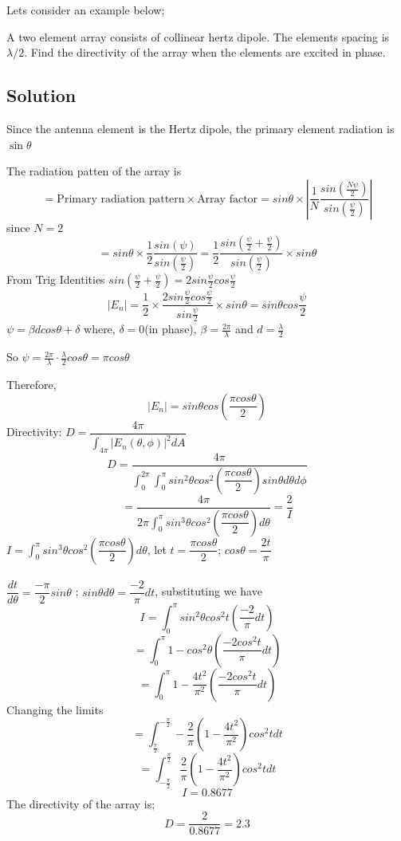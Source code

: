 Lets consider an example below;
\begin{exmp}
A two element array consists of collinear hertz dipole. The elements spacing is $\lambda/2$. Find the directivity of the array when the elements are excited in phase. 
\subsection*{\centering Solution} 
Since the antenna element is the Hertz dipole, the primary element radiation is $\sin\theta$ 

The radiation patten of the array is
\begin{dmath*}
= \text{Primary radiation pattern} \times \text{Array factor}= sin\theta \times \left|\dfrac{1}{N} \dfrac{sin(\frac{N \psi}{2})}{sin(\frac{\psi}{2})}\right|
\end{dmath*}
since $N = 2$ 
$$ = sin\theta \times \dfrac{1}{2} \dfrac{sin( \psi)}{sin(\frac{\psi}{2})} = \dfrac{1}{2} \dfrac{sin(\frac{\psi}{2}+ \frac{\psi}{2})}{sin(\frac{\psi}{2})} \times sin\theta $$ 
From Trig Identities $sin(\frac{\psi}{2}+ \frac{\psi}{2}) = 2sin\frac{\psi}{2}cos\frac{\psi}{2}$
$$ |E_{n}| = \dfrac{1}{2} \times \dfrac{2sin\frac{\psi}{2}cos\frac{\psi}{2}}{sin\frac{\psi}{2}}  \times sin\theta = sin\theta cos\frac{\psi}{2}	$$
$\psi = \beta dcos\theta +  \delta $ where, $\delta = 0$(in phase), $\beta = \frac{2\pi}{\lambda}$ and $ d = \frac{\lambda}{2} $

So $\psi = \frac{2\pi}{\lambda} \cdot \frac{\lambda}{2} cos\theta  = \pi cos\theta$ 

Therefore, $$|E_{n}| = sin\theta cos\left(\dfrac{\pi cos\theta}{2}\right) $$ 
Directivity: $ D = \dfrac{4\pi}{\int_{4\pi}|E_{n}(\theta, \phi)|^2 dA}$ 
$$ D = \dfrac{4\pi}{\int_{0}^{2\pi}\int_{0}^{\pi} sin^2\theta cos^2\left(\dfrac{\pi cos\theta}{2}\right)sin\theta d\theta d\phi}$$  $$ = \dfrac{4\pi}{ 2\pi \int_{0}^{\pi} sin^3\theta cos^2\left(\dfrac{\pi cos\theta}{2}\right) d\theta} = \dfrac{2}{I}$$
$ I = \int_{0}^{\pi} sin^3\theta cos^2\left(\dfrac{\pi cos\theta}{2}\right) d\theta $, 
let $t = \dfrac{\pi cos\theta}{2} $; $ cos\theta = \dfrac{2t}{\pi}$ \\ \\
$\dfrac{dt}{d\theta} = \dfrac{- \pi}{2} sin\theta $ ; $sin\theta d\theta = \dfrac{-2}{\pi}dt$, substituting we have
$$  I = \int_{0}^{\pi} sin^2\theta cos^2t\left(\dfrac{-2}{\pi}dt\right) $$
$$ = \int_{0}^{\pi} 1 - cos^2\theta \left(\dfrac{-2 cos^2 t}{\pi} dt\right) $$ 
$$  = \int_{0}^{\pi} 1 - \dfrac{4t^2}{\pi^2} \left(\dfrac{-2 cos^2 t}{\pi} dt\right)$$
Changing the limits
$$  = \int_{\frac{\pi}{2}}^{-\frac{\pi}{2}} -\dfrac{2}{\pi}\left(1 - \dfrac{4t^2}{\pi^2}\right) cos^2t dt$$
$$  = \int_{-\frac{\pi}{2}}^{\frac{\pi}{2}} \dfrac{2}{\pi}\left(1 - \dfrac{4t^2}{\pi^2}\right) cos^2t dt$$
$$ I = 0.8677 $$ 
The directivity of the array  is; 
$$ D = \dfrac{2}{0.8677} = 2.3 $$ 
\end{exmp}

